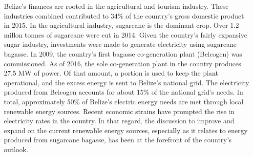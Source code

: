 \documentclass[twocolumn,10pt]{asme2e}
\begin{document}
Belize's finances are rooted in the agricultural and tourism industry. These industries combined contributed to 34\% of the country's gross domestic product in 2015. In the agricultural industry, sugarcane is the dominant crop. Over 1.2 millon tonnes of sugarcane were cut in 2014. Given the country's fairly expansive sugar industry, investments were made to generate electricity using sugarcane bagasse. In 2009, the country's first bagasse co-generation plant (Belcogen) was commissioned. As of 2016, the sole co-generation plant in the country produces 27.5 MW of power. Of that amount, a portion is used to keep the plant operational, and the excess energy is sent to Belize's national grid. The electricity produced from Belcogen accounts for about 15\% of the national grid's needs. In total, approximately 50\% of Belize's electric energy needs are met through local renewable energy sources. Recent economic strains have prompted the rise in electricity rates in the country. In that regard, the discussion to improve and expand on the current renewable energy sources, especially as it relates to energy produced from sugarcane bagasse, has been at the forefront of the country's outlook.
\end{document}
